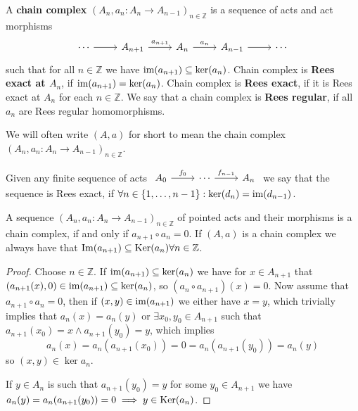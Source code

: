 \begin{definition}
    A \textbf{chain complex} $(A_n,a_{n} : A_n\to A_{n-1})_{n\in\mathbb{Z}}$ is a sequence of acts and act morphisms
    \[\begin{tikzcd}
        \cdots & {A_{n+1}} & {A_n} & {A_{n-1}} & \cdots
        \arrow[from=1-1, to=1-2]
        \arrow["{a_{n+1}}", from=1-2, to=1-3]
        \arrow["{a_n}", from=1-3, to=1-4]
        \arrow[from=1-4, to=1-5]
    \end{tikzcd}\]
    such that for all $n\in\mathbb{Z}$ we have $\text{im}(a_{n+1})\subseteq\mathrm{ker}(a_n)$. Chain complex is \textbf{Rees exact
    at $A_n$}, if $\text{im}(a_{n+1})=\mathrm{ker}(a_n)$. Chain complex is \textbf{Rees exact}, if it is Rees exact at $A_n$ for each $n\in\mathbb{Z}$. 
    We say that a chain complex is \textbf{Rees regular}, if all $a_n$ are Rees regular homomorphisms.
\end{definition}
We will often write $(A,a)$ for short to mean the chain complex $(A_n,a_{n} : A_n\to A_{n-1})_{n\in\mathbb{Z}}$. \par
Given any finite sequence of acts $\begin{tikzcd}
	{A_0} & \cdots & {A_n}
	\arrow["{f_0}", from=1-1, to=1-2]
	\arrow["{f_{n-1}}", from=1-2, to=1-3]
\end{tikzcd}$ we say that the sequence is Rees exact, if $\forall n\in\{1,\dots,n-1\} : \mathrm{ker}(d_n) = \text{im}(d_{n-1})$.
\begin{remark} 
    A sequence $(A_n,a_{n} : A_n\to A_{n-1})_{n\in\mathbb{Z}}$ of pointed acts and their morphisms is a chain complex, if and only if $a_{n+1}\circ a_n = 0$. If $(A,a)$ is a chain complex 
    we always have that $\mathrm{Im}(a_{n+1})\subseteq\mathrm{Ker}(a_n) \forall n\in\mathbb{Z}$.
\end{remark}
\begin{proof}[Proof]
    Choose $n\in\mathbb{Z}$. 
    If $\text{im}(a_{n+1})\subseteq\mathrm{ker}(a_n)$ we have for $x\in A_{n+1}$ that
    $(a_{n+1}(x),0)\in\text{im}(a_{n+1})\subseteq\mathrm{ker}(a_n)$, so $(a_n\circ a_{n+1})(x) = 0$. Now assume that $a_{n+1}\circ a_n = 0$, then 
    if $(x,y)\in\text{im}(a_{n+1})$ we either have $x=y$, which trivially implies that $a_n(x)=a_n(y)$ or 
    $\exists x_0,y_0\in A_{n+1}$ such that $a_{n+1}(x_0)=x\land a_{n+1}(y_0)=y$, which implies 
    \[
        a_n(x) = a_n(a_{n+1}(x_0)) = 0 = a_n(a_{n+1}(y_0)) = a_n(y)
    \]
    so $(x,y)\in\ker{a_n}$.\par
    If $y\in A_n$ is such that $a_{n+1}(y_0)=y$ for some $y_0\in A_{n+1}$ we 
    have $a_n(y) = a_n(a_{n+1}(y_0)) = 0 \implies y\in\mathrm{Ker}(a_n)$.
\end{proof}
